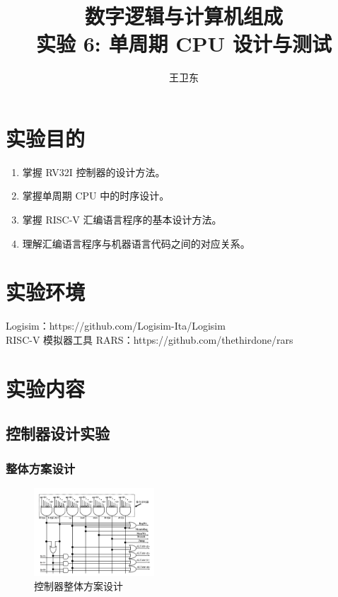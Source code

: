\documentclass{article}
\title{数字逻辑与计算机组成\\ {\small 实验 6: 单周期 CPU 设计与测试
}}
\author{王卫东\quad 221900332}
\date{\zhtoday}
\begin{document}
    \maketitle

    \section{实验目的}

    \begin{enumerate}
        \item 掌握 RV32I 控制器的设计方法。
        \item 掌握单周期 CPU 中的时序设计。
        \item 掌握 RISC-V 汇编语言程序的基本设计方法。
        \item 理解汇编语言程序与机器语言代码之间的对应关系。
    \end{enumerate}
    \section{实验环境}

    Logisim：https://github.com/Logisim-Ita/Logisim \\
    RISC-V 模拟器工具 RARS：https://github.com/thethirdone/rars

    \section{实验内容}
    
    \subsection{控制器设计实验}

    \subsubsection{整体方案设计}
    \begin{figure}[H]
    \centering
    \includegraphics[width=0.4\textwidth]{1.1.png}
    \caption{控制器整体方案设计}
    \end{figure}
\end{document}
